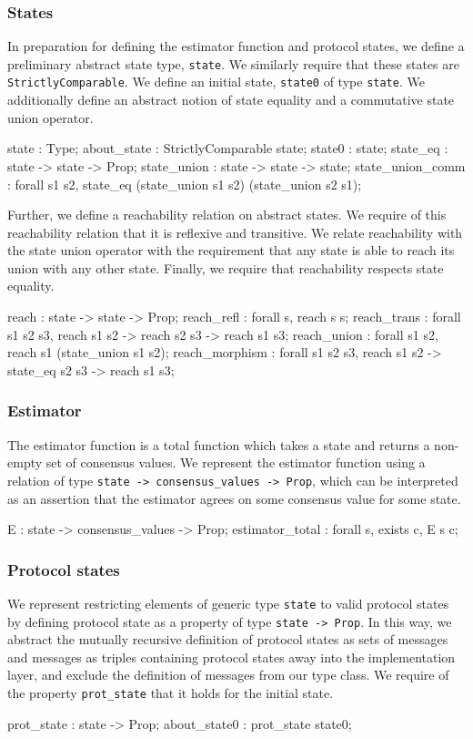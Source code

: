 \documentclass[runningheads]{llncs}
\begin{document}
\subsubsection{States} 
In preparation for defining the estimator function and protocol states, we define a preliminary abstract state type, 
\verb|state|. We similarly require that these states are \verb|StrictlyComparable|. We define an initial state, \verb|state0| of type \verb|state|. We additionally define an abstract notion of state equality and a commutative state union operator. 
\begin{coq}
	state : Type;
	about_state : StrictlyComparable state;
	state0 : state;
	state_eq : state -> state -> Prop;
	state_union : state -> state -> state;
	state_union_comm : forall s1 s2, state_eq (state_union s1 s2) 
																						(state_union s2 s1);
\end{coq}
Further, we define a reachability relation on abstract states. We require of this reachability relation that it is reflexive and transitive. We relate reachability with the state union operator with the requirement that any state is able to reach its union with any other state. Finally, we require that reachability respects state equality. 
\begin{coq}
	reach : state -> state -> Prop;
	reach_refl : forall s, reach s s; 
	reach_trans : forall s1 s2 s3, reach s1 s2 -> reach s2 s3 -> reach s1 s3; 
	reach_union : forall s1 s2, reach s1 (state_union s1 s2);  
	reach_morphism : forall s1 s2 s3, reach s1 s2 -> state_eq s2 s3 -> reach s1 s3;  
\end{coq}

\subsubsection{Estimator} 
The estimator function is a total function which takes a state and returns a non-empty set of consensus values. We represent the estimator function using a relation of type \verb|state -> consensus_values -> Prop|, which can be interpreted as an assertion that the estimator agrees on some consensus value for some state. 
\begin{coq}
	E : state -> consensus_values -> Prop; 
	estimator_total : forall s, exists c, E s c; 
\end{coq}

\subsubsection{Protocol states}
We represent restricting elements of generic type \verb|state| to valid protocol states by defining protocol state as a property of type \verb|state -> Prop|. In this way, we abstract the mutually recursive definition of protocol states as sets of messages and messages as triples containing protocol states away into the implementation layer, and exclude the definition of messages from our type class. We require of the property \verb|prot_state| that it holds for the initial state. 
\begin{coq}
	prot_state : state -> Prop; 
	about_state0 : prot_state state0; 
\end{coq}
\end{document}

